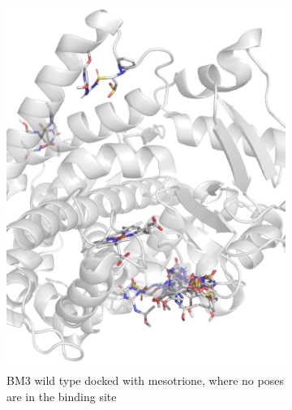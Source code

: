 \documentclass{article}
\begin{document}
\begin{figure}[H]
\begin{subfigure}{0.9\linewidth}
	\end{subfigure}
\end{figure}
\par


\begin{figure}[H] \label{dock}
	\caption{\label{dock} Comparison of the wild type and the best performing mutant from the virtual directed evolution \textbf{experiment 1} docked with mesotrione}
	\begin{subfigure}{0.49\textwidth}
		\includegraphics[width=\linewidth]{figs/wt-mesotrione.png}
		\caption{BM3 wild type docked with mesotrione, where no poses are in the binding site}
	\end{subfigure}
	\begin{subfigure}{0.49\textwidth}

\end{subfigure}
\end{figure}
\end{document}
